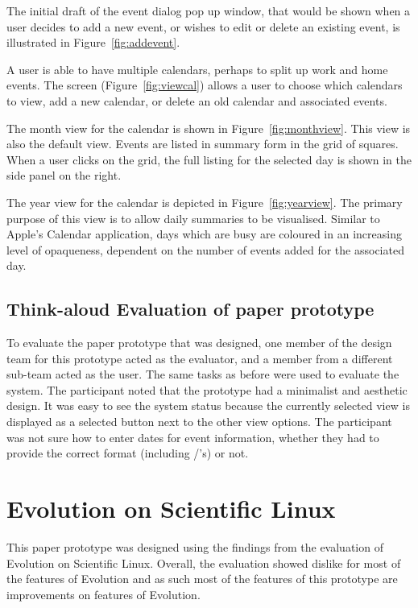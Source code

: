 \documentclass{article}
\begin{document}
The initial draft of the event dialog pop up window, that would be
shown when a user decides to add a new event, or wishes to edit or
delete an existing event, is illustrated in Figure~\ref{fig:addevent}.

A user is able to have multiple calendars, perhaps to split up work and
home events. The screen (Figure~\ref{fig:viewcal}) allows a user to
choose which calendars to view, add a new calendar, or delete an old
calendar and associated events.

The month view for the calendar is shown in Figure~\ref{fig:monthview}.
This view is also the default view. Events are listed in summary form
in the grid of squares. When a user clicks on the grid, the full listing
for the selected day is shown in the side panel on the right.

The year view for the calendar is depicted in Figure~\ref{fig:yearview}.
The primary purpose of this view is to allow daily summaries to be
visualised. Similar to Apple's Calendar application, days which are
busy are coloured in an increasing level of opaqueness, dependent on
the number of events added for the associated day.

\subsection{Think-aloud Evaluation of paper prototype}

To evaluate the paper prototype that was designed, one member of the
design team for this prototype acted as the evaluator, and a member
from a different sub-team acted as the user. The same tasks as before
were used to evaluate the system. The participant noted that the
prototype had a minimalist and aesthetic design. It was easy to see the
system status because the currently selected view is displayed as a
selected button next to the other view options. The participant was not
sure how to enter dates for event information, whether they had to
provide the correct format (including /'s) or not.


\section{Evolution on Scientific Linux}

This paper prototype was designed using the findings from the evaluation 
of Evolution on Scientific Linux. Overall, the evaluation showed
dislike for most of the features of Evolution and as such most of the
features of this prototype are improvements on features of Evolution.
\end{document}
